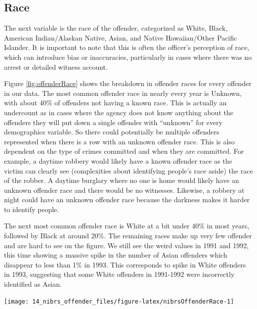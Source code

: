 \documentclass[
]{krantz}
\let\origfigure\figure
\let\endorigfigure\endfigure
\renewenvironment{figure}[1][2] {
    \expandafter\origfigure\expandafter[H]
} {
    \endorigfigure
}
\begin{document}
\subsection{Race}\label{race-2}

The next variable is the race of the offender, categorized
as White, Black, American Indian/Alaskan Native, Asian, and
Native Hawaiian/Other Pacific Islander. It is important to
note that this is often the officer's perception of race,
which can introduce bias or inaccuracies, particularly in
cases where there was no arrest or detailed witness account.

Figure \ref{fig:offenderRace} shows the breakdown in
offender races for every offender in our data. The most
common offender race in nearly every year is Unknown, with
about 40\% of offenders not having a known race. This is
actually an undercount as in cases where the agency does not
know anything about the offenders they will put down a
single offender with ``unknown'' for every demographics
variable. So there could potentially be multiple offenders
represented when there is a row with an unknown offender
race. This is also dependent on the type of crimes committed
and when they are committed. For example, a daytime robbery
would likely have a known offender race as the victim can
clearly see (complexities about identifying people's race
aside) the race of the robber. A daytime burglary where no
one is home would likely have an unknown offender race and
there would be no witnesses. Likewise, a robbery at night
could have an unknown offender race because the darkness
makes it harder to identify people.

The next most common offender race is White at a bit under
40\% in most years, followed by Black at around 20\%. The
remaining races make up very few offender and are hard to
see on the figure. We still see the weird values in 1991 and
1992, this time showing a massive spike in the number of
Asian offenders which disappear to less than 1\% in 1993.
This corresponds to spike in White offenders in 1993,
suggesting that some White offenders in 1991-1992 were
incorrectly identified as Asian.

\begin{figure}

{\centering \texttt{[image: 14\_nibrs\_offender\_files/figure-latex/nibrsOffenderRace-1]} 

}

\caption{The share of offenders by race, 1991-2022.}\label{fig:nibrsOffenderRace}
\end{figure}
\end{document}
